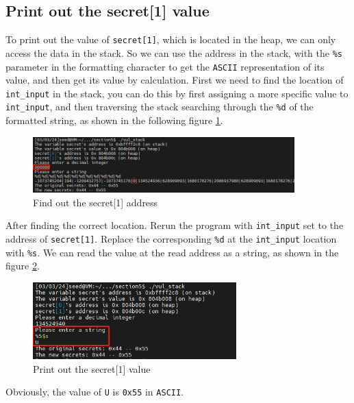 \documentclass[a4paper,11pt]{article}
\begin{document}
\subsection{Print out the secret[1] value}
To print out the value of \verb|secret[1]|, which is located in the heap, we can only access the data in the stack. So we can use the address in the stack, with the \verb|%s| parameter in the formatting character to get the \verb|ASCII| representation of its value, and then get its value by calculation. First we need to find the location of \verb|int_input| in the stack, you can do this by first assigning a more specific value to \verb|int_input|, and then traversing the stack searching through the \verb|%d| of the formatted string, as shown in the following figure \ref{fig:task23-1}.
\begin{figure}[h]
    \centering
       \includegraphics[width=0.9\textwidth]{figures/task23/task23-1.png}
    \caption{Find out the secret[1] address}\label{fig:task23-1}
\end{figure}
After finding the correct location. Rerun the program with \verb|int_input| set to the address of \verb|secret[1]|. Replace the corresponding \verb|%d| at the \verb|int_input| location with \verb|%s|. We can read the value at the read address as a string, as shown in the figure \ref{fig:task23-2}.
\begin{figure}[h]
    \centering
       \includegraphics[width=0.7\textwidth]{figures/task23/task23-2.png}
    \caption{Print out the secret[1] value}\label{fig:task23-2}
\end{figure}

Obviously, the value of \verb|U| is \verb|0x55| in \verb|ASCII|.
\end{document}
